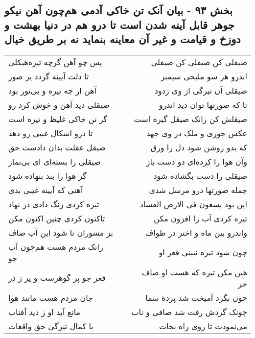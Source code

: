 \begin{center}
\section*{بخش ۹۳ - بیان آنک تن خاکی آدمی هم‌چون آهن نیکو جوهر قابل آینه شدن است تا درو هم در دنیا بهشت و دوزخ و قیامت و غیر آن معاینه بنماید نه بر طریق خیال}
\label{sec:sh093}
\begin{longtable}{l p{0.5cm} r}
پس چو آهن گرچه تیره‌هیکلی
&&
صیقلی کن صیقلی کن صیقلی
\\
تا دلت آیینه گردد پر صور
&&
اندرو هر سو ملیحی سیمبر
\\
آهن ار چه تیره و بی‌نور بود
&&
صیقلی آن تیرگی از وی زدود
\\
صیقلی دید آهن و خوش کرد رو
&&
تا که صورتها توان دید اندرو
\\
گر تن خاکی غلیظ و تیره است
&&
صیقلش کن زانک صیقل گیره است
\\
تا درو اشکال غیبی رو دهد
&&
عکس حوری و ملک در وی جهد
\\
صیقل عقلت بدان دادست حق
&&
که بدو روشن شود دل را ورق
\\
صیقلی را بسته‌ای ای بی‌نماز
&&
وآن هوا را کرده‌ای دو دست باز
\\
گر هوا را بند بنهاده شود
&&
صیقلی را دست بگشاده شود
\\
آهنی که آیینه غیبی بدی
&&
جمله صورتها درو مرسل شدی
\\
تیره کردی زنگ دادی در نهاد
&&
این بود یسعون فی الارض الفساد
\\
تاکنون کردی چنین اکنون مکن
&&
تیره کردی آب را افزون مکن
\\
بر مشوران تا شود این آب صاف
&&
واندرو بین ماه و اختر در طواف
\\
زانک مردم هست هم‌چون آب جو
&&
چون شود تیره نبینی قعر او
\\
قعر جو پر گوهرست و پر ز در
&&
هین مکن تیره که هست او صاف حر
\\
جان مردم هست مانند هوا
&&
چون بگرد آمیخت شد پردهٔ سما
\\
مانع آید او ز دید آفتاب
&&
چونک گردش رفت شد صافی و ناب
\\
با کمال تیرگی حق واقعات
&&
می‌نمودت تا روی راه نجات
\\
\end{longtable}
\end{center}
